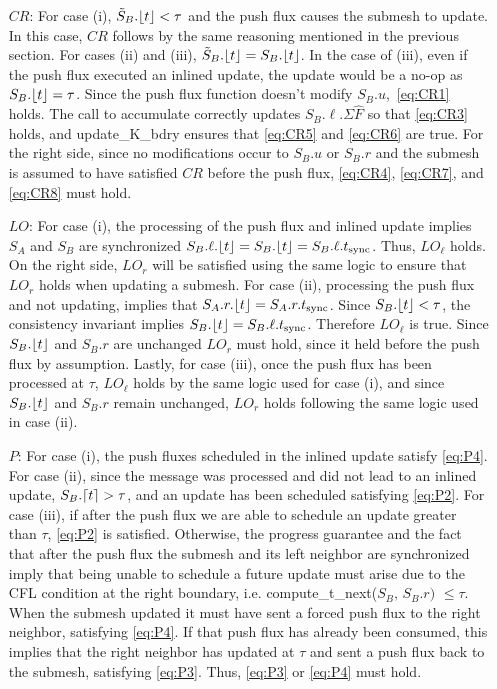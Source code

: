 \begin{enumerate}
    \item[$CR$:] For case (i), $\tilde{S}_B.\lfloor t \rfloor < \tau$ and the push flux causes the submesh to update. In this case, $CR$ follows by the same reasoning mentioned in the previous section. For cases (ii) and (iii), $\tilde{S}_B.\lfloor t \rfloor = S_B.\lfloor t \rfloor$. In the case of (iii), even if the push flux executed an inlined update, the update would be a no-op as $S_B.\lfloor t \rfloor=\tau$. Since the push flux function doesn't modify $S_B.u$,~\eqref{eq:CR1} holds. The call to {\sc accumulate} correctly updates $S_B.\ell.\Sigma \hat{F}$ so that \eqref{eq:CR3} holds, and {\sc update\_K\_bdry} ensures that \eqref{eq:CR5} and \eqref{eq:CR6} are true. For the right side, since no modifications occur to $S_B.u$ or $S_B.r$ and the submesh is assumed to have satisfied $CR$ before the push flux, \eqref{eq:CR4}, \eqref{eq:CR7}, and \eqref{eq:CR8} must hold.
    \item[$LO$:] For case (i), the processing of the push flux and inlined update implies $S_A$ and $S_B$ are synchronized $S_B.\ell.\lfloor t \rfloor=S_B.\lfloor t \rfloor=S_B.\ell.t_{\text{sync}}$. Thus, $LO_{\ell}$ holds. On the right side, $LO_r$ will be satisfied using the same logic to ensure that $LO_r$ holds when updating a submesh. For case (ii), processing the push flux and not updating, implies that $S_A.r.\lfloor t \rfloor=S_A.r.t_{\text{sync}}$. Since $S_B.\lfloor t \rfloor < \tau$, the consistency invariant implies $S_B.\lfloor t \rfloor = S_B.\ell.t_{\text{sync}}$. Therefore $LO_{\ell}$ is true. Since $S_B.\lfloor t \rfloor$ and $S_B.r$ are unchanged $LO_r$ must hold, since it held before the push flux by assumption. Lastly, for case (iii), once the push flux has been processed at $\tau$, $LO_{\ell}$ holds by the same logic used for case (i), and since $S_B.\lfloor t \rfloor$ and $S_B.r$ remain unchanged, $LO_r$ holds following the same logic used in case (ii).
    \item[$P$:] For case (i), the push fluxes scheduled in the inlined update satisfy \eqref{eq:P4}. For case (ii), since the message was processed and did not lead to an inlined update, $S_B.\lceil t \rceil > \tau$, and an update has been scheduled satisfying \eqref{eq:P2}. For case (iii), if after the push flux we are able to schedule an update greater than $\tau$, \eqref{eq:P2} is satisfied. Otherwise, the progress guarantee and the fact that after the push flux the submesh and its left neighbor are synchronized imply that being unable to schedule a future update must arise due to the CFL condition at the right boundary, i.e. {\sc compute\_t\_next($S_B,\,S_B.r)$} $\le \tau$. When the submesh updated it must have sent a forced push flux to the right neighbor, satisfying \eqref{eq:P4}. If that push flux has already been consumed, this implies that the right neighbor has updated at $\tau$ and sent a push flux back to the submesh, satisfying \eqref{eq:P3}. Thus, \eqref{eq:P3} or \eqref{eq:P4} must hold.

\end{enumerate}
